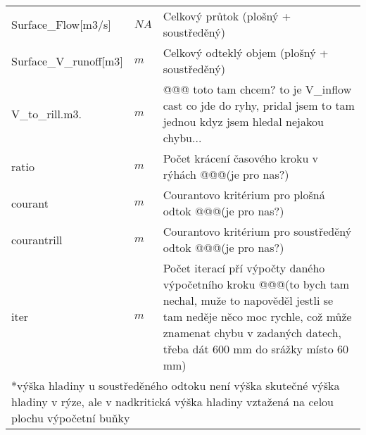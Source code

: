 \begin{table}[h!]
\begin{tabular}{llp{}}
 Surface\_Flow[m3/s]   &  $NA$ & Celkový průtok (plošný + soustředěný)  \\
 Surface\_V\_runoff[m3]   &   $m$  & Celkový odteklý objem (plošný + soustředěný) \\
 V\_to\_rill.m3. & $m$ &  @@@ toto tam chcem? to je V\_inflow cast co jde do ryhy, pridal jsem to tam jednou kdyz jsem hledal nejakou chybu...\\
 ratio & $m$ &  Počet krácení časového kroku v rýhách @@@(je pro nas?)\\
 courant & $m$ &  Courantovo kritérium pro plošná odtok @@@(je pro nas?)\\
 courantrill & $m$ & Courantovo kritérium pro soustředěný odtok @@@(je pro nas?) \\
 iter & $m$ &  Počet iterací pří výpočty daného výpočetního kroku @@@(to bych tam nechal, muže to napověděl jestli se tam neděje něco moc rychle, což může znamenat chybu v zadaných datech, třeba dát 600 mm do srážky místo 60 mm) \\
  \hline
   \hline
   \multicolumn{3}{p{\textwidth}}{*výška hladiny u soustředěného odtoku není výška skutečné výška hladiny v rýze, ale v nadkritická výška hladiny vztažená na celou plochu výpočetní buňky}
 \end{tabular}

\end{table}



